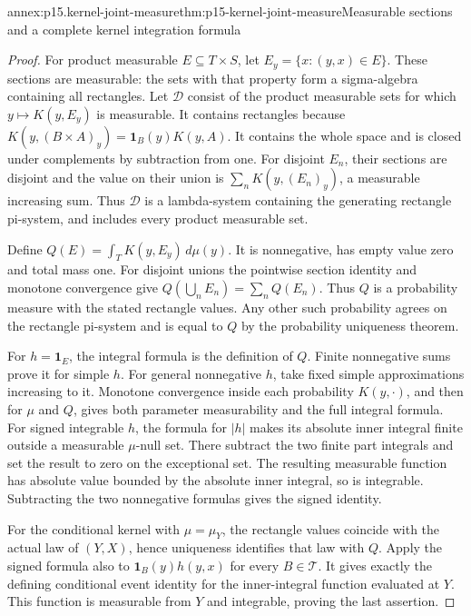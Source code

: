 \begin{annexitem}{annex:p15.kernel-joint-measure}{thm:p15-kernel-joint-measure}{Measurable sections and a complete kernel integration formula}
\begin{proof}
For product measurable \(E\subseteq T\times S\), let
\(E_y=\{x:(y,x)\in E\}\).
These sections are measurable: the sets with that property form
a sigma-algebra containing all rectangles.
Let \(\mathcal D\) consist of the product measurable sets for which
\(y\mapsto K(y,E_y)\) is measurable.
It contains rectangles because
\(K(y,(B\times A)_y)=\mathbf1_B(y)K(y,A)\).
It contains the whole space and is closed under complements by
subtraction from one. For disjoint \(E_n\), their sections are
disjoint and the value on their union is
\(\sum_nK(y,(E_n)_y)\), a measurable increasing sum.
Thus \(\mathcal D\) is a lambda-system containing the generating
rectangle pi-system, and includes every product measurable set.

Define \(Q(E)=\int_TK(y,E_y)\,d\mu(y)\).
It is nonnegative, has empty value zero and total mass one.
For disjoint unions the pointwise section identity and monotone
convergence give \(Q(\bigcup_nE_n)=\sum_nQ(E_n)\).
Thus \(Q\) is a probability measure with the stated rectangle values.
Any other such probability agrees on the rectangle pi-system and
is equal to \(Q\) by the probability uniqueness theorem.

For \(h=\mathbf1_E\), the integral formula is the definition of \(Q\).
Finite nonnegative sums prove it for simple \(h\).
For general nonnegative \(h\), take fixed simple approximations
increasing to it. Monotone convergence inside each probability
\(K(y,\cdot)\), and then for \(\mu\) and \(Q\), gives both
parameter measurability and the full integral formula.
For signed integrable \(h\), the formula for \(|h|\) makes its
absolute inner integral finite outside a measurable \(\mu\)-null set.
There subtract the two finite part integrals and set the result
to zero on the exceptional set.
The resulting measurable function has absolute value bounded by
the absolute inner integral, so is integrable.
Subtracting the two nonnegative formulas gives the signed identity.

For the conditional kernel with \(\mu=\mu_Y\), the rectangle values
coincide with the actual law of \((Y,X)\), hence uniqueness identifies
that law with \(Q\).
Apply the signed formula also to \(\mathbf1_B(y)h(y,x)\) for every
\(B\in\mathcal T\). It gives exactly the defining conditional
event identity for the inner-integral function evaluated at \(Y\).
This function is measurable from \(Y\) and integrable, proving the
last assertion.
\end{proof}
\end{annexitem}

